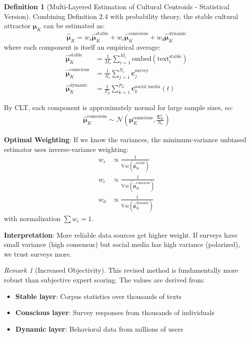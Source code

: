 \documentclass[11pt,a4paper]{article}
\theoremstyle{definition}
\newtheorem{definition}{Definition}[section]
\theoremstyle{remark}
\newtheorem{remark}{Remark}[section]
\newcommand{\cc}{\mathbf{c}}
\begin{document}
\begin{small}
\begin{definition}[Multi-Layered Estimation of Cultural Centroids - Statistical Version]
Combining Definition 2.4 with probability theory, the stable cultural attractor \(\boldsymbol{\mu}_K\) can be estimated as:
\begin{equation}
\hat{\boldsymbol{\mu}}_K = w_s \hat{\boldsymbol{\mu}}_K^{\text{stable}} + w_c \hat{\boldsymbol{\mu}}_K^{\text{conscious}} + w_d \hat{\boldsymbol{\mu}}_K^{\text{dynamic}}
\end{equation}
where each component is itself an empirical average:
\begin{align}
\hat{\boldsymbol{\mu}}_K^{\text{stable}} &= \frac{1}{M_s} \sum_{i=1}^{M_s} \text{embed}(\text{text}_i^{\text{stable}}) \\
\hat{\boldsymbol{\mu}}_K^{\text{conscious}} &= \frac{1}{N_c} \sum_{j=1}^{N_c} \cc_j^{\text{survey}} \\
\hat{\boldsymbol{\mu}}_K^{\text{dynamic}} &= \frac{1}{P_d} \sum_{k=1}^{P_d} \cc_k^{\text{social media}}(t)
\end{align}

By CLT, each component is approximately normal for large sample sizes, so:
\begin{align}
\hat{\boldsymbol{\mu}}_K^{\text{conscious}} \sim \mathcal{N}\left(\boldsymbol{\mu}_K^{\text{conscious}}, \frac{\boldsymbol{\Sigma}_K^c}{N_c}\right)
\end{align}

\textbf{Optimal Weighting}: If we know the variances, the minimum-variance unbiased estimator uses inverse-variance weighting:
\begin{align}
w_s &\propto \frac{1}{\text{Var}(\hat{\boldsymbol{\mu}}_K^{\text{stable}})} \\
w_c &\propto \frac{1}{\text{Var}(\hat{\boldsymbol{\mu}}_K^{\text{conscious}})} \\
w_d &\propto \frac{1}{\text{Var}(\hat{\boldsymbol{\mu}}_K^{\text{dynamic}})}
\end{align}
with normalization \(\sum w_i = 1\).

\textbf{Interpretation}: More reliable data sources get higher weight. If surveys have small variance (high consensus) but social media has high variance (polarized), we trust surveys more.
\end{definition}

\begin{remark}[Increased Objectivity]
This revised method is fundamentally more robust than subjective expert scoring. The values are derived from:
\begin{itemize}
    \item \textbf{Stable layer}: Corpus statistics over thousands of texts
    \item \textbf{Conscious layer}: Survey responses from thousands of individuals
    \item \textbf{Dynamic layer}: Behavioral data from millions of users
\end{itemize}


\end{remark}
\end{small}
\end{document}
